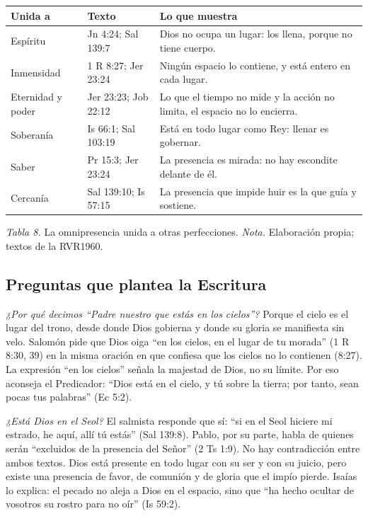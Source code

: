 \documentclass[11pt,letterpaper]{article}
\begin{document}
\begin{center}\small\renewcommand{\arraystretch}{1.22}
\begin{tabular}{@{}L{2.6cm}L{4.4cm}L{7.0cm}@{}}
\toprule
\textbf{Unida a} & \textbf{Texto} & \textbf{Lo que muestra} \\ \midrule
Espíritu & Jn 4:24; Sal 139:7 & Dios no ocupa un lugar: los llena, porque no tiene cuerpo. \\
Inmensidad & 1 R 8:27; Jer 23:24 & Ningún espacio lo contiene, y está entero en cada lugar. \\
Eternidad y poder & Jer 23:23; Job 22:12 & Lo que el tiempo no mide y la acción no limita, el espacio no lo encierra. \\
Soberanía & Is 66:1; Sal 103:19 & Está en todo lugar como Rey: llenar es gobernar. \\
Saber & Pr 15:3; Jer 23:24 & La presencia es mirada: no hay escondite delante de él. \\
Cercanía & Sal 139:10; Is 57:15 & La presencia que impide huir es la que guía y sostiene. \\
\bottomrule
\end{tabular}\par
{\footnotesize\color{gris}\textit{Tabla 8.} La omnipresencia unida a otras perfecciones. \textit{Nota.} Elaboración propia; textos de la RVR1960.}
\end{center}

\subsection{Preguntas que plantea la Escritura}

\emph{¿Por qué decimos ``Padre nuestro que estás en los cielos''?} Porque el cielo es el lugar del trono, desde donde Dios gobierna y donde su gloria se manifiesta sin velo. Salomón pide que Dios oiga ``en los cielos, en el lugar de tu morada'' (1 R 8:30, 39) en la misma oración en que confiesa que los cielos no lo contienen (8:27). La expresión ``en los cielos'' señala la majestad de Dios, no su límite. Por eso aconseja el Predicador: ``Dios está en el cielo, y tú sobre la tierra; por tanto, sean pocas tus palabras'' (Ec 5:2).

\emph{¿Está Dios en el Seol?} El salmista responde que sí: ``si en el Seol hiciere mi estrado, he aquí, allí tú estás'' (Sal 139:8). Pablo, por su parte, habla de quienes serán ``excluidos de la presencia del Señor'' (2 Ts 1:9). No hay contradicción entre ambos textos. Dios está presente en todo lugar con su ser y con su juicio, pero existe una presencia de favor, de comunión y de gloria que el impío pierde. Isaías lo explica: el pecado no aleja a Dios en el espacio, sino que ``ha hecho ocultar de vosotros su rostro para no oír'' (Is 59:2).
\end{document}
